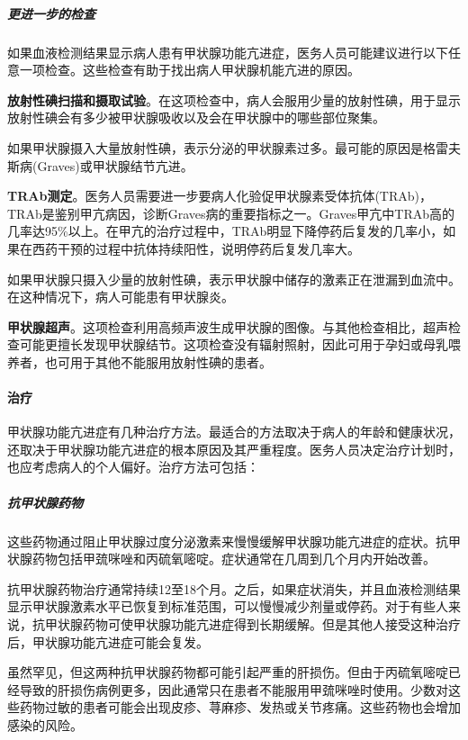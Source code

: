\documentclass[letterpaper,12pt]{article}
\begin{document}
					\subparagraph{更进一步的检查}\qquad	
					
					如果血液检测结果显示病人患有甲状腺功能亢进症，医务人员可能建议进行以下任意一项检查。这些检查有助于找出病人甲状腺机能亢进的原因。
						
					\textbf{\songti 放射性碘扫描和摄取试验}。在这项检查中，病人会服用少量的放射性碘，用于显示放射性碘会有多少被甲状腺吸收以及会在甲状腺中的哪些部位聚集。
							
					如果甲状腺摄入大量放射性碘，表示分泌的甲状腺素过多。最可能的原因是格雷夫斯病(Graves)或甲状腺结节亢进。
						
					\textbf{\songti \textrm TRAb测定}。医务人员需要进一步要病人化验促甲状腺素受体抗体(TRAb)，TRAb是鉴别甲亢病因，诊断Graves病的重要指标之一。Graves甲亢中TRAb高的几率达95\%以上。在甲亢的治疗过程中，TRAb明显下降停药后复发的几率小，如果在西药干预的过程中抗体持续阳性，说明停药后复发几率大。
						
					如果甲状腺只摄入少量的放射性碘，表示甲状腺中储存的激素正在泄漏到血流中。在这种情况下，病人可能患有甲状腺炎。
						
					\textbf{\songti 甲状腺超声}。这项检查利用高频声波生成甲状腺的图像。与其他检查相比，超声检查可能更擅长发现甲状腺结节。这项检查没有辐射照射，因此可用于孕妇或母乳喂养者，也可用于其他不能服用放射性碘的患者。
						
			
				\paragraph{治疗}\qquad
			
				甲状腺功能亢进症有几种治疗方法。最适合的方法取决于病人的年龄和健康状况，还取决于甲状腺功能亢进症的根本原因及其严重程度。医务人员决定治疗计划时，也应考虑病人的个人偏好。治疗方法可包括：
			
					\subparagraph{抗甲状腺药物}\qquad
					
					这些药物通过阻止甲状腺过度分泌激素来慢慢缓解甲状腺功能亢进症的症状。抗甲状腺药物包括甲巯咪唑和丙硫氧嘧啶。症状通常在几周到几个月内开始改善。
				
					抗甲状腺药物治疗通常持续12至18个月。之后，如果症状消失，并且血液检测结果显示甲状腺激素水平已恢复到标准范围，可以慢慢减少剂量或停药。对于有些人来说，抗甲状腺药物可使甲状腺功能亢进症得到长期缓解。但是其他人接受这种治疗后，甲状腺功能亢进症可能会复发。
						
					虽然罕见，但这两种抗甲状腺药物都可能引起严重的肝损伤。但由于丙硫氧嘧啶已经导致的肝损伤病例更多，因此通常只在患者不能服用甲巯咪唑时使用。少数对这些药物过敏的患者可能会出现皮疹、荨麻疹、发热或关节疼痛。这些药物也会增加感染的风险。
			
\end{document}
